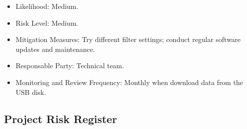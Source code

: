 \documentclass{article}
\begin{document}
\begin{enumerate}
\begin{itemize}
        \item Likelihood: Medium.
        \item Risk Level: Medium.
        \item Mitigation Measures: Try different filter settings; conduct regular software updates and maintenance.
        \item Responsable Party: Technical team.
        \item Monitoring and Review Frequency: Monthly when download data from the USB disk.
    \end{itemize}
\end{enumerate}

\subsection{Project Risk Register}
\end{document}
